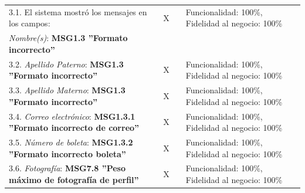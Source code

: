 \documentclass[oneside,10pt]{book}
\begin{document}
\begin{tabularx}{\textwidth}{ X l l X }
\multicolumn{1}{|X|}{3.1. El sistema mostró los mensajes en los campos:} & \multicolumn{1}{l|}{X}   & \multicolumn{1}{l|}{}   & \multicolumn{1}{X|}{Funcionalidad: 100\%, Fidelidad al negocio: 100\%}              \\
\multicolumn{1}{|X|}{\textit{Nombre(s)}: \textbf{MSG1.3 ''Formato incorrecto''}} & \multicolumn{1}{l|}{}   & \multicolumn{1}{l|}{}   & \multicolumn{1}{X|}{}              \\ \hline
\multicolumn{1}{|X|}{3.2. \textit{Apellido Paterno}: \textbf{MSG1.3 ''Formato incorrecto''}} & \multicolumn{1}{l|}{X}   & \multicolumn{1}{l|}{}   & \multicolumn{1}{X|}{Funcionalidad: 100\%, Fidelidad al negocio: 100\%}              \\ \hline
\multicolumn{1}{|X|}{3.3. \textit{Apellido Materno}: \textbf{MSG1.3 ''Formato incorrecto''}} & \multicolumn{1}{l|}{X}   & \multicolumn{1}{l|}{}   & \multicolumn{1}{X|}{Funcionalidad: 100\%, Fidelidad al negocio: 100\%}              \\ \hline
\multicolumn{1}{|X|}{3.4. \textit{Correo electrónico}: \textbf{MSG1.3.1 ''Formato incorrecto de correo''}} & \multicolumn{1}{l|}{X}   & \multicolumn{1}{l|}{}   & \multicolumn{1}{X|}{Funcionalidad: 100\%, Fidelidad al negocio: 100\%}              \\ \hline
\multicolumn{1}{|X|}{3.5. \textit{Número de boleta}: \textbf{MSG1.3.2 ''Formato incorrecto boleta''}} & \multicolumn{1}{l|}{X}   & \multicolumn{1}{l|}{}   & \multicolumn{1}{X|}{Funcionalidad: 100\%, Fidelidad al negocio: 100\%}              \\ \hline
\multicolumn{1}{|X|}{3.6. \textit{Fotografía}: \textbf{MSG7.8 ''Peso máximo de fotografía de perfil''}} & \multicolumn{1}{l|}{X}   & \multicolumn{1}{l|}{}   & \multicolumn{1}{X|}{Funcionalidad: 100\%, Fidelidad al negocio: 100\%}              \\ \hline

\end{tabularx}

\newpage
\end{document}
